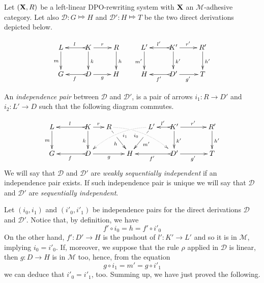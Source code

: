 \documentclass[a4paper,UKenglish,cleveref,pdftex, thm-restate,numberwithinsect]{lipics}
\def\R{\mathsf{R}}
\def\X{\textbf {\textup{X}}}
\newcommand{\dder}[1]{\mathscr{#1}}
\begin{document}

\begin{definition}
  \label{de:sequential-independence}
  Let $(\X, \R)$ be a left-linear DPO-rewriting system with $\X$ an $\mathcal{M}$-adhesive category. Let also $\dder{D}\colon G\Mapsto H$ and $\dder{D'}\colon H\Mapsto T$ be the two direct derivations depicted below.
	
	\[\xymatrix{L \ar[d]_{m}& K \ar[d]^{k}\ar@{>->}[l]_{l} \ar[r]^{r} & R \ar[d]^{h} & L' \ar[d]_{m'}& K' \ar[d]^{k'}\ar@{>->}[l]_{l'} \ar[r]^{r'} & R' \ar[d]^{h'}\\G & \ar@{>->}[l]^{f} D \ar[r]_{g}& H & H & \ar@{>->}[l]^{f'} D' \ar[r]_{g'}& T}\]
	
	An \emph{independence pair} between $\dder{D}$ and $\dder{D'}$, is a pair of  arrows $i_1\colon R\to D'$ and $i_2\colon L'\to D$ such that the following diagram commutes.
	
	\[\xymatrix@C=15pt{L \ar[d]_{m}&& K \ar[d]_{k}\ar@{>->}[ll]_{l} \ar[r]^{r} & R \ar@/^.35cm/@{.>}[drrr]|(.3)\hole_(.4){i_0} \ar[dr]|(.3)\hole_{h} && L' \ar@/_.35cm/@{.>}[dlll]^(.4){i_1} \ar[dl]|(.3)\hole^{m'}& K' \ar[d]^{k'}\ar@{>->}[l]_{l'} \ar[rr]^{r'} && R' \ar[d]^{h'}\\G && \ar@{>->}[ll]^{f} D \ar[rr]_{g}&& H  && \ar@{>->}[ll]^{f'} D' \ar[rr]_{g'}&& T}\]
	We will say that $\dder{D}$ and $\dder{D'}$ are \emph{weakly sequentially independent} if an independence pair exists. If such independence pair is unique we will say that $\dder{D}$ and $\dder{D'}$ are \emph{sequentially independent}.
\end{definition}

\begin{example}
\end{example}
\begin{example}
\end{example}


 Let $(i_0, i_1)$ and $(i'_0, i'_1)$ be independence pairs for the direct derivations $\dder{D}$ and $\dder{D'}$. Notice that, by definition, we have
 \[f'\circ i_0=h=f'\circ i'_0\]
	On the other hand, 
	$f'\colon D'\to H$ is  the pushout of $l'\colon K'\to L'$ and so it is in $\mathcal{M}$, implying $i_0=i'_0$. If, moreover, we suppose that the rule $\rho$ applied in $\dder{D}$ is linear, then $g\colon D\to H$ is in $\mathcal{M}$ too, hence, from the equation
	\[
	g\circ i_1=m'= g\circ i'_1\]
	we can deduce that $i'_0=i'_1$, too. Summing up, we have just proved the following.
	
\end{document}
